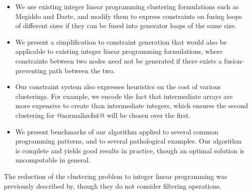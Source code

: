 \begin{itemize}
\item   
We use existing integer linear programming clustering formulations such as Megiddo\cite{megiddo1998optimal} and Darte\cite{darte2002contraction},
and modify them to express constraints on fusing loops of different sizes if they can be fused into generator loops of the same size.

\item
We present a simplification to constraint generation that would also be applicable to existing integer linear programming formulations,
where constraints between two nodes need not be generated if there exists a fusion-preventing path between the two. 

\item   Our constraint system also expresses heuristics on the cost of various clusterings. For example, we encode the fact that intermediate arrays are more expensive to create than intermediate integers, which ensures the second clustering for @normalizeInt@ will be chosen over the first. 

\item   We present benchmarks of our algorithm applied to several common programming patterns, and to several pathological examples. Our algorithm is complete and yields good results in practice, though an optimal solution is uncomputable in general. 
\end{itemize}

The reduction of the clustering problem to integer linear programming was previously described by\cite{megiddo1998optimal}, though they do not consider filtering operations.




